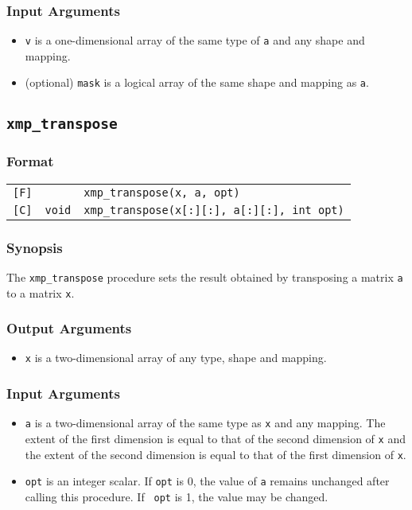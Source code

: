 \subsubsection*{Input Arguments}
\begin{itemize}
 \item {\tt v} is a one-dimensional array of the same type of {\tt a}
       and any shape and mapping.
 \item (optional) {\tt mask} is a logical array of the same shape and
       mapping as {\tt a}.
\end{itemize}


\subsection{\tt xmp\_transpose}

\subsubsection*{Format}

\begin{tabular}{lll}

\verb![F]!&            & {\tt xmp\_transpose(x, a, opt)}\\

\verb![C]!& {\tt void} & {\tt xmp\_transpose(x[:][:], a[:][:], int opt)}\\

\end{tabular}

\subsubsection*{Synopsis}

The {\tt xmp\_transpose} procedure sets the result obtained by
transposing a matrix {\tt a} to a matrix {\tt x}.

\subsubsection*{Output Arguments}
\begin{itemize}
 \item {\tt x} is a two-dimensional array of any type, shape and mapping.
\end{itemize}

\subsubsection*{Input Arguments}
\begin{itemize}
 \item {\tt a} is a two-dimensional array of the same type as {\tt x}
       and any mapping. The extent of the first dimension is equal to
       that of the second dimension of {\tt x} and the extent of the
       second dimension is equal to that of the first dimension of
       {\tt x}.
 \item {\tt opt} is an integer scalar. If {\tt opt} is 0, the value of
       {\tt a} remains unchanged after calling this procedure. If {\tt
       opt} is 1, the value may be changed.
\end{itemize}


